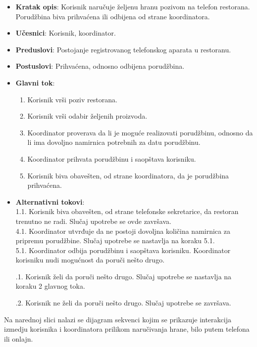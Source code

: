 \begin{itemize}
    \item \textbf{Kratak opis}: Korisnik naručuje željenu hranu pozivom na telefon restorana. Porudžbina biva prihvaćena ili odbijena od strane koordinatora.
    \item \textbf{Učesnici}: Korisnik, koordinator.
    \item \textbf{Preduslovi}: Postojanje registrovanog telefonskog aparata u restoranu.
    \item \textbf{Postuslovi}: Prihvaćena, odnosno odbijena porudžbina.
     \item \textbf{Glavni tok}:
    \begin{enumerate}
        \item Korisnik vrši poziv restorana.
        \item Korisnik vrši odabir željenih proizvoda.
        \item Koordinator proverava da li je moguće realizovati porudžbinu, odnosno
        da li ima dovoljno namirnica potrebnih za datu porudžbinu.
        \item Koordinator prihvata porudžbinu i saopštava korisniku.
        \item Korisnik biva obavešten, od strane koordinatora, da je porudžbina prihvaćena.
    \end{enumerate}
    \item \textbf{Alternativni tokovi}:\\
     1.1. Korisnik biva obavešten, od strane telefonske sekretarice, da restoran trenutno ne radi. Slučaj upotrebe se ovde završava.\\
     4.1. Koordinator utvrđuje da ne postoji dovoljna količina namirnica za pripremu porudžbine. Slučaj upotrebe se nastavlja na koraku 5.1.\\
     5.1. Koordinator odbija porudžbinu i saopštava korisniku. Koordinator korisniku nudi mogućnost da poruči nešto drugo.  
     
      .1. Korisnik želi da poruči nešto drugo. Slučaj upotrebe se nastavlja na koraku 2 glavnog toka. 
      
      .2. Korisnik ne želi da poruči nešto drugo. Slučaj upotrebe se završava. \\
    
    \end{itemize}
Na narednoj slici nalazi se dijagram sekvenci kojim se prikazuje interakcija izmedju korisnika i koordinatora prilikom naručivanja hrane, bilo putem telefona ili onlajn.

